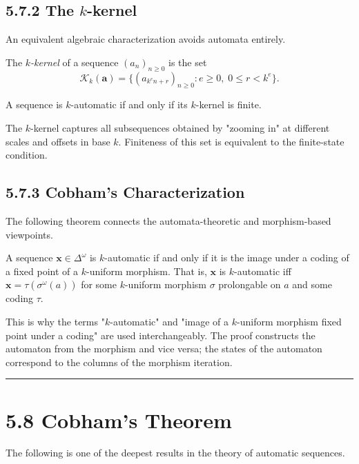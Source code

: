 \subsection{5.7.2 The $k$-kernel}

An equivalent algebraic characterization avoids automata entirely.

\begin{definition}
The \textit{$k$-kernel} of a sequence $(a_n)_{n \geq 0}$ is the set
\[
\mathcal{K}_k(\mathbf{a}) = \{ (a_{k^e n + r})_{n \geq 0} : e \geq 0,\; 0 \leq r < k^e\} .
\]
\end{definition}

\begin{theorem}[Eilenberg 1974]
A sequence is $k$-automatic if and only if its $k$-kernel is finite.

The $k$-kernel captures all subsequences obtained by "zooming in" at different scales and offsets in base $k$. Finiteness of this set is equivalent to the finite-state condition.
\end{theorem}

\subsection{5.7.3 Cobham's Characterization}

The following theorem connects the automata-theoretic and morphism-based viewpoints.

\begin{theorem}[Cobham 1972]
A sequence $\mathbf{x} \in \Delta^\omega$ is $k$-automatic if and only if it is the image under a coding of a fixed point of a $k$-uniform morphism. That is, $\mathbf{x}$ is $k$-automatic iff $\mathbf{x} = \tau(\sigma^\omega(a))$ for some $k$-uniform morphism $\sigma$ prolongable on $a$ and some coding $\tau$.

This is why the terms "$k$-automatic" and "image of a $k$-uniform morphism fixed point under a coding" are used interchangeably. The proof constructs the automaton from the morphism and vice versa; the states of the automaton correspond to the columns of the morphism iteration.

\bigskip\hrule\bigskip
\end{theorem}

\section{5.8 Cobham's Theorem}

The following is one of the deepest results in the theory of automatic sequences.

